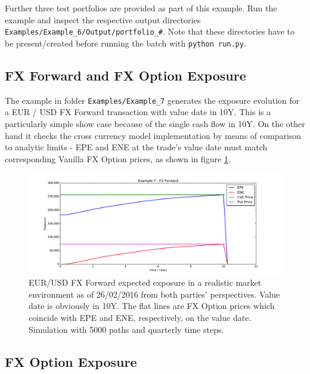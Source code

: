 \documentclass[12pt, a4paper]{article}
\begin{document}
{Further three test portfolios are provided as part of this example. Run the example and inspect the respective output
directories {\tt Examples/Example\_6/Output/portfolio\_\#}. Note that these directories have to be present/created
before running the batch with {\tt python run.py}.

\subsection{FX Forward and FX Option Exposure}\label{sec:fxfwd}

The example in folder {\tt Examples/Example\_7} generates the exposure evolution for a EUR / USD FX Forward transaction
with value date in 10Y. This is a particularly simple show case because of the single cash flow in 10Y. On the other
hand it checks the cross currency model implementation by means of comparison to analytic limits - EPE and ENE at the
trade's value date must match corresponding Vanilla FX Option prices, as shown in figure \ref{fig_5}.
\begin{figure}[h]
\begin{center}
\includegraphics[scale=0.45]{mpl_fxforward.pdf}
\end{center}
\caption{EUR/USD FX Forward expected exposure in a realistic market environment as of 26/02/2016 from both parties'
  perspectives. Value date is obviously in 10Y. The flat lines are FX Option prices which coincide with EPE and ENE,
  respectively, on the value date. Simulation with 5000 paths and quarterly time steps.}
\label{fig_5}
\end{figure}

\subsection*{FX Option Exposure}\label{sec:fxoption}

}
\end{document}
